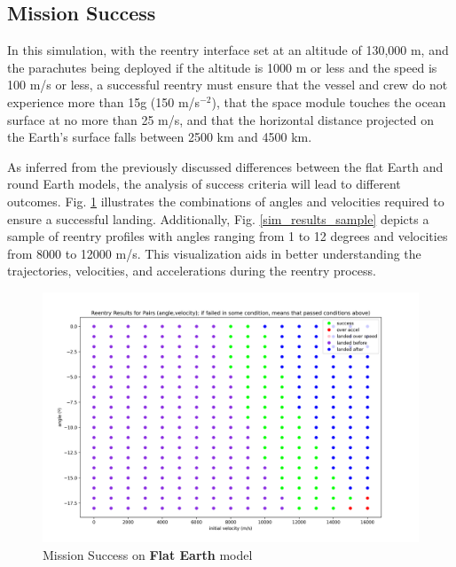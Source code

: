 \documentclass[runningheads]{llncs}
\begin{document}
\subsection{Mission Success}
In this simulation, with the reentry interface set at an altitude of 130,000 m, and the parachutes being deployed if the altitude is 1000 m or less and the speed is 100 m/s or less, a successful reentry must ensure that the vessel and crew do not experience more than 15g (150 m/s\(^{-2}\)), that the space module touches the ocean surface at no more than 25 m/s, and that the horizontal distance projected on the Earth's surface falls between 2500 km and 4500 km. 

As inferred from the previously discussed differences between the flat Earth and round Earth models, the analysis of success criteria will lead to different outcomes. Fig. \ref{success_flat_earth} illustrates the combinations of angles and velocities required to ensure a successful landing. Additionally, Fig. \ref{sim_results_sample} depicts a sample of reentry profiles with angles ranging from 1 to 12 degrees and velocities from 8000 to 12000 m/s. This visualization aids in better understanding the trajectories, velocities, and accelerations during the reentry process.

\begin{figure}
\centering
\includegraphics[width=1\textwidth]{images/success_flat_earth.png}
\caption{Mission Success on \textbf{Flat Earth} model} \label{success_flat_earth}
\end{figure}
\end{document}
